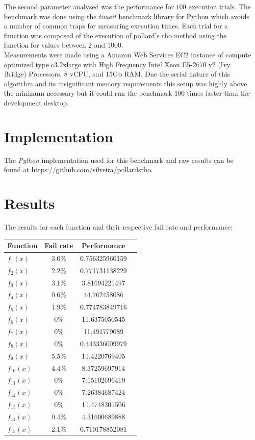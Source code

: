 \documentclass{article}
\begin{document}
The second parameter analysed was the performance for $100$ execution trials. The benchmark was done using the \textit{timeit} benchmark library for Python which avoids a number of common traps for measuring execution times. Each trial for a function was composed of the execution of pollard's rho method using the function for values between $2$ and $1000$.\\

Measurements were made using a Amazon Web Services EC2 instance of compute optimized type c3.2xlarge with High Frequency Intel Xeon E5-2670 v2 (Ivy Bridge) Processors, 8 vCPU, and 15Gb RAM. Due the serial nature of this algorithm and its insignificant memory requirements this setup was highly above the minimum necessary but it could run the benchmark 100 times faster than the development desktop.\\

\section{Implementation}

The \textit{Python} implementation used for this benchmark and raw results can be found at https://github.com/silveira/pollardsrho.

\section{Results}

The results for each function and their respective fail rate and performance:\\

\begin{tabular}{l*{2}{c}r}
Function              & Fail rate & Performance \\
\hline
$f_1(x)$ & 3.0\% & 0.756325960159 \\ 
$f_2(x)$ & 2.2\% & 0.771731138229 \\ 
$f_3(x)$ & 3.1\% & 3.81694221497 \\ 
$f_4(x)$ & 0.6\% & 44.762458086 \\ 
$f_5(x)$ & 1.9\% & 0.774783849716\\ 
$f_6(x)$ & 0\% & 11.6375050545 \\ 
$f_7(x)$ & 0\% & 11.491779089 \\ 
$f_8(x)$ & 0\% & 0.443336009979 \\ 
$f_9(x)$ & 5.5\% & 11.4220769405 \\ 
$f_{10}(x)$ & 4.4\% & 8.37259697914 \\ 
$f_{11}(x)$ & 0\% & 7.15102696419 \\ 
$f_{12}(x)$ & 0\% & 7.26384687424 \\ 
$f_{13}(x)$ & 0\% & 11.4748301506 \\ 
$f_{14}(x)$ & 0.4\% & 4.31600689888 \\ 
$f_{15}(x)$  & 2.1\% & 0.710178852081 \\ 
\end{tabular}
\end{document}
